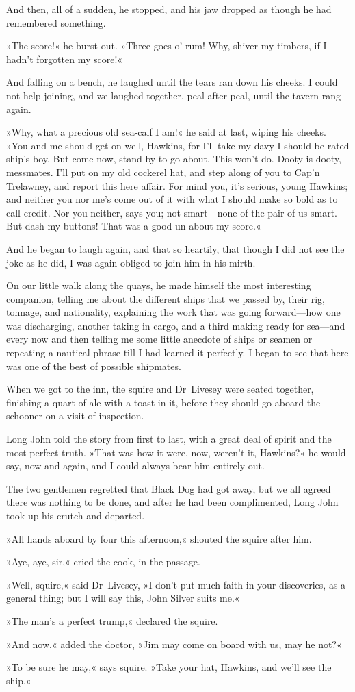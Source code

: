 And then, all of a sudden, he stopped, and his jaw dropped as though he had remembered something.

»The score!« he burst out. »Three goes o' rum! Why, shiver my timbers, if I hadn't forgotten my score!«

And falling on a bench, he laughed until the tears ran down his cheeks. I could not help joining, and we laughed together, peal after peal, until the tavern rang again.

»Why, what a precious old sea-calf I am!« he said at last, wiping his cheeks. »You and me should get on well, Hawkins, for I'll take my davy I should be rated ship's boy. But come now, stand by to go about. This won't do. Dooty is dooty, messmates. I'll put on my old cockerel hat, and step along of you to Cap'n Trelawney, and report this here affair. For mind you, it's serious, young Hawkins; and neither you nor me's come out of it with what I should make so bold as to call credit. Nor you neither, says you; not smart—none of the pair of us smart. But dash my buttons! That was a good un about my score.«

And he began to laugh again, and that so heartily, that though I did not see the joke as he did, I was again obliged to join him in his mirth.

On our little walk along the quays, he made himself the most interesting companion, telling me about the different ships that we passed by, their rig, tonnage, and nationality, explaining the work that was going forward—how one was discharging, another taking in cargo, and a third making ready for sea—and every now and then telling me some little anecdote of ships or seamen or repeating a nautical phrase till I had learned it perfectly. I began to see that here was one of the best of possible shipmates.

When we got to the inn, the squire and Dr~Livesey were seated together, finishing a quart of ale with a toast in it, before they should go aboard the schooner on a visit of inspection.

Long John told the story from first to last, with a great deal of spirit and the most perfect truth. »That was how it were, now, weren't it, Hawkins?« he would say, now and again, and I could always bear him entirely out.

The two gentlemen regretted that Black Dog had got away, but we all agreed there was nothing to be done, and after he had been complimented, Long John took up his crutch and departed.

»All hands aboard by four this afternoon,« shouted the squire after him.

»Aye, aye, sir,« cried the cook, in the passage.

»Well, squire,« said Dr~Livesey, »I don't put much faith in your discoveries, as a general thing; but I will say this, John Silver suits me.«

»The man's a perfect trump,« declared the squire.

»And now,« added the doctor, »Jim may come on board with us, may he not?«

»To be sure he may,« says squire. »Take your hat, Hawkins, and we'll see the ship.«